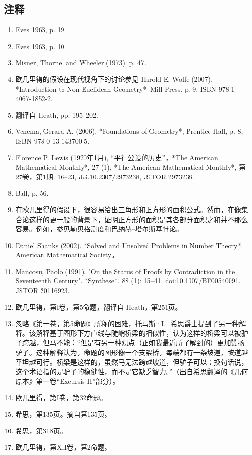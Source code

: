 \subsection{注释}  
\begin{enumerate}
\item Eves 1963, p. 19.  
\item Eves 1963, p. 10.  
\item Misner, Thorne, and Wheeler (1973), p. 47.  
\item 欧几里得的假设在现代视角下的讨论参见 Harold E. Wolfe (2007). *Introduction to Non-Euclidean Geometry*. Mill Press. p. 9. ISBN 978-1-4067-1852-2.  
\item 翻译自 Heath, pp. 195–202.  
\item Venema, Gerard A. (2006), *Foundations of Geometry*, Prentice-Hall, p. 8, ISBN 978-0-13-143700-5.  
\item Florence P. Lewis (1920年1月), “平行公设的历史”，*The American Mathematical Monthly*, 27 (1), *The American Mathematical Monthly*, 第27卷，第1期: 16–23, doi:10.2307/2973238, JSTOR 2973238.  
\item Ball, p. 56.  
\item 在欧几里得的假设下，很容易给出三角形和正方形的面积公式。然而，在像集合论这样的更一般的背景下，证明正方形的面积是其各部分面积之和并不那么容易。例如，参见勒贝格测度和巴纳赫–塔尔斯基悖论。  
\item Daniel Shanks (2002). *Solved and Unsolved Problems in Number Theory*. American Mathematical Society。
\item Mancosu, Paolo (1991). "On the Status of Proofs by Contradiction in the Seventeenth Century". *Synthese*. 88 (1): 15–41. doi:10.1007/BF00540091. JSTOR 20116923.  
\item 欧几里得，第I卷，第5命题，翻译自 Heath，第251页。  
\item 忽略《第一卷，第5命题》所称的困难，托马斯·L·希思爵士提到了另一种解释。该解释基于图形下方直线与陡峭桥梁的相似性，认为这样的桥梁可以被驴子跨越，但马不能：“但是有另一种观点（正如我最近所了解到的）更加赞扬驴子。这种解释认为，命题的图形像一个支架桥，每端都有一条坡道，坡道越平坦越可行。桥梁是这样的，虽然马无法跨越坡道，但驴子可以；换句话说，这个术语指的是驴子的稳健性，而不是它缺乏智力。”（出自希思翻译的《几何原本》第一卷“Excursis II”部分）。
\item 欧几里得，第I卷，第32命题。  
\item 希思，第135页。摘自第135页。  
\item 希思，第318页。  
\item 欧几里得，第XII卷，第2命题。  

\end{enumerate}

